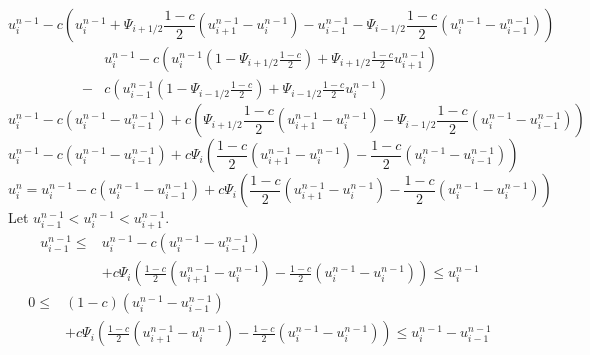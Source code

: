 \documentclass[../thesis.tex]{subfiles}
\begin{document}
\begin{equation}
    u_{i}^{n-1} -
    c\left( u_{i}^{n-1} + \Psi_{i+1/2}\frac{1-c}{2}\left( u_{i+1}^{n-1}- u_{i}^{n-1} \right)
    - u_{i-1}^{n-1} - \Psi_{i-1/2}\frac{1-c}{2}\left( u_{i}^{n-1}- u_{i-1}^{n-1} \right) \right)
\end{equation}
\begin{equation}
\begin{split}
        &u_{i}^{n-1} -
        c\left( u_{i}^{n-1}\left( 1 - \Psi_{i+1/2}\frac{1-c}{2} \right)
        + \Psi_{i+1/2}\frac{1-c}{2} u_{i+1}^{n-1} \right)
        \\
        - &c\left( u_{i-1}^{n-1}\left( 1 - \Psi_{i-1/2}\frac{1-c}{2} \right) 
        + \Psi_{i-1/2}\frac{1-c}{2}u_{i}^{n-1} \right)
    \end{split}
\end{equation}
\begin{equation}
    u_{i}^{n-1} -
    c\left( u_{i}^{n-1}- u_{i-1}^{n-1} \right)
    + c\left(
        \Psi_{i+1/2}\frac{1-c}{2}\left( u_{i+1}^{n-1}- u_{i}^{n-1} \right)
        - \Psi_{i-1/2}\frac{1-c}{2}\left( u_{i}^{n-1}- u_{i-1}^{n-1} \right)
    \right)
\end{equation}
\begin{equation}
    u_{i}^{n-1} -
    c\left( u_{i}^{n-1}- u_{i-1}^{n-1} \right)
    + c\Psi_{i}\left(
        \frac{1-c}{2}\left( u_{i+1}^{n-1}- u_{i}^{n-1} \right)
        - \frac{1-c}{2}\left( u_{i}^{n-1}- u_{i-1}^{n-1} \right)
    \right)
\end{equation}
\[
    u_i^n =
    u_{i}^{n-1} -
    c\left( u_{i}^{n-1}- u_{i-1}^{n-1} \right)
    + c\Psi_{i}\left(
        \frac{1-c}{2}\left( u_{i+1}^{n-1}- u_{i}^{n-1} \right)
        - \frac{1-c}{2}\left( u_{i}^{n-1}- u_{i}^{n-1} \right)
    \right)
\]
Let \( u_{i-1}^{n-1} < u_{i}^{n-1} < u_{i+1}^{n-1} \).
\begin{equation}
    \begin{split}
        u_{i-1}^{n-1}
        \leq
        &u_{i}^{n-1} -
        c\left( u_{i}^{n-1}- u_{i-1}^{n-1} \right)
        \\&+ c\Psi_{i}\left(
            \frac{1-c}{2}\left( u_{i+1}^{n-1}- u_{i}^{n-1} \right)
            - \frac{1-c}{2}\left( u_{i}^{n-1}- u_{i}^{n-1} \right)
        \right)
        \leq
        u_i^{n-1}
    \end{split}
\end{equation}
\begin{equation}
    \begin{split}
        0
        \leq
        &(1-c)\left( u_{i}^{n-1}- u_{i-1}^{n-1} \right)
        \\&+ c\Psi_{i}\left(
            \frac{1-c}{2}\left( u_{i+1}^{n-1}- u_{i}^{n-1} \right)
            - \frac{1-c}{2}\left( u_{i}^{n-1}- u_{i}^{n-1} \right)
        \right)
        \leq
        u_i^{n-1} - u_{i-1}^{n-1}
    \end{split}
\end{equation}
\end{document}
